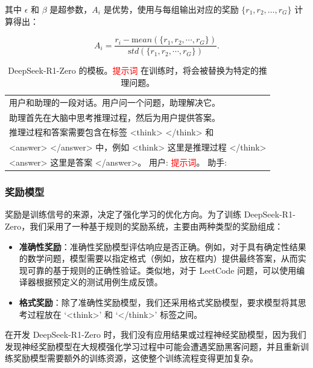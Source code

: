 \documentclass[lang=cn,a4paper,newtx]{elegantpaper}
\newcommand{\dsro}{DeepSeek-R1-Zero}
\begin{document}
其中 $\epsilon$ 和 $\beta$ 是超参数，$A_i$ 是优势，使用与每组输出对应的奖励 $\{r_1, r_2, \ldots, r_G\}$ 计算得出：

\begin{equation}
  A_i = \frac{r_i - {\mathrm mean(\{r_1, r_2, \cdots, r_G\})}}{{\mathrm std(\{r_1, r_2, \cdots, r_G\})}}.
\end{equation}

\begin{table}[t]
  \centering
  \small
  \begin{tabular}{l}
  \toprule
  用户和助理的一段对话。用户问一个问题，助理解决它。\\
  助理首先在大脑中思考推理过程，然后为用户提供答案。\\
  推理过程和答案需要包含在标签 <think> </think> 和 \\ <answer> </answer> 中，例如 <think> 这里是推理过程 </think> \\ <answer> 这里是答案 </answer>。 
  用户: \textcolor{red}{提示词}。 助手: \\
  \bottomrule
  \end{tabular}
  \caption{\dsro{} 的模板。\textcolor{red}{提示词} 在训练时，将会被替换为特定的推理问题。}
  \label{tab:r0_template}
\end{table}

\subsubsection{奖励模型}

奖励是训练信号的来源，决定了强化学习的优化方向。为了训练 \dsro{}，我们采用了一种基于规则的奖励系统，主要由两种类型的奖励组成：

\begin{itemize}[topsep=0pt]
  \item \textbf{准确性奖励}：准确性奖励模型评估响应是否正确。例如，对于具有确定性结果的数学问题，模型需要以指定格式（例如，放在框内）提供最终答案，从而实现可靠的基于规则的正确性验证。类似地，对于 LeetCode 问题，可以使用编译器根据预定义的测试用例生成反馈。
  \item \textbf{格式奖励}：除了准确性奖励模型，我们还采用格式奖励模型，要求模型将其思考过程放在 `<think>' 和 `</think>' 标签之间。
\end{itemize}

在开发 \dsro{} 时，我们没有应用结果或过程神经奖励模型，因为我们发现神经奖励模型在大规模强化学习过程中可能会遭遇奖励黑客问题，并且重新训练奖励模型需要额外的训练资源，这使整个训练流程变得更加复杂。
\end{document}
